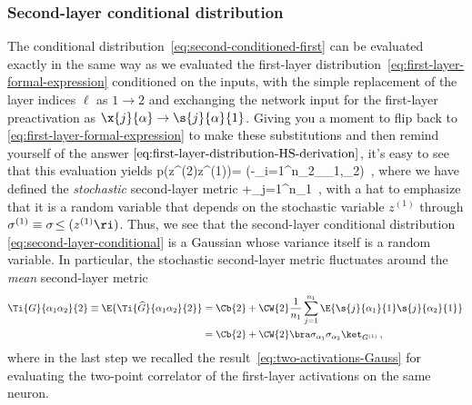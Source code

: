 \subsubsection{Second-layer conditional distribution}
The conditional distribution~\eqref{eq:second-conditioned-first} can be evaluated exactly in the same way as we evaluated the first-layer distribution~\eqref{eq:first-layer-formal-expression} conditioned on the inputs, with the simple replacement of the layer indices $\ell$ as $1\to 2$ and exchanging the network input for the first-layer preactivation as $\x{j}{\alpha}\to \s{j}{\alpha}{1}$. Giving you a moment to flip back to \eqref{eq:first-layer-formal-expression} to make these substitutions and then remind yourself of the answer $\eqref{eq:first-layer-distribution-HS-derivation}$, it's easy to see that this evaluation yields
\be\label{eq:second-layer-conditional}
p\!\le(z^{(2)}\Big\vert z^{(1)}\ri)=  \exp\!\le(-\sum_{i=1}^{n_2}\sum_{\alpha_1,\alpha_2\in\D}\ri)\, ,
\ee
where we have defined the \emph{stochastic} second-layer metric
\be
{}\equiv  {}+\sum_{j=1}^{n_1}\, ,
\ee
with a hat to emphasize that it is a random variable that depends on the stochastic variable $z^{(1)}$ through $\sigma^{(1)} \equiv \sigma\!\le(z^{(1)}\ri)$. Thus, we see that the second-layer conditional distribution \eqref{eq:second-layer-conditional} is a Gaussian whose variance itself is a random variable.
In particular, the stochastic second-layer metric fluctuates around the \emph{mean} second-layer metric
\begin{align}\label{eq:second-layer-metric-mean}
\Ti{G}{\alpha_1 \alpha_2}{2}\equiv\E{\Ti{\widehat{G}}{\alpha_1 \alpha_2}{2}}&=\Cb{2}+\CW{2}\frac{1}{n_1}\sum_{j=1}^{n_1}\E{\s{j}{\alpha_1}{1}\s{j}{\alpha_2}{1}}\,   \\
&=\Cb{2}+\CW{2}\bra \sigma_{\alpha_1} \sigma_{\alpha_2} \ket_{G^{(1)}}\, , \nonumber
\end{align}
where in the last step we recalled the result~\eqref{eq:two-activations-Gauss} for evaluating the two-point correlator of the first-layer activations on the same neuron.

